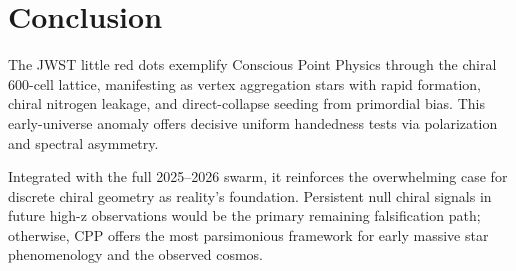 \documentclass[11pt]{article}
\begin{document}
\section{Conclusion}
The JWST little red dots exemplify Conscious Point Physics through the chiral 600-cell lattice, manifesting as vertex aggregation stars with rapid formation, chiral nitrogen leakage, and direct-collapse seeding from primordial bias. This early-universe anomaly offers decisive uniform handedness tests via polarization and spectral asymmetry.  

Integrated with the full 2025--2026 swarm, it reinforces the overwhelming case for discrete chiral geometry as reality's foundation. Persistent null chiral signals in future high-z observations would be the primary remaining falsification path; otherwise, CPP offers the most parsimonious framework for early massive star phenomenology and the observed cosmos.
\end{document}
